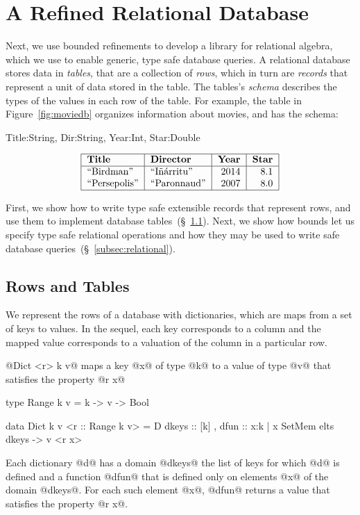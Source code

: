 \section{A Refined Relational Database}\label{sec:database}

Next, we use bounded refinements to develop a library
for relational algebra, which we use to enable generic,
type safe database queries.
%
A relational database stores data in \emph{tables},
that are a collection of \emph{rows}, which in turn 
are \emph{records} that represent a unit of data 
stored in the table.
The tables's \textit{schema} describes the types of 
the values in each row of the table.
For example, the table in Figure~\ref{fig:moviedb} organizes 
information about movies, and has the schema:
%
\begin{code}
 Title:String, Dir:String, Year:Int, Star:Double
\end{code}

\begin{table}[h]
\captionsetup{justification=centering}
\caption{Example entries for Movies Database.}
\label{fig:moviedb} 
\centering
$$
\begin{tabular}{| l | l| r | r |}
  \hline
  \textbf{Title} & \textbf{Director} & \textbf{Year} & \textbf{Star} \\
  \hline  
  ``Birdman'' & ``I\~{n}\'{a}rritu''   & 2014 & 8.1\\
  ``Persepolis''  & ``Paronnaud'' & 2007 & 8.0 \\ 
  \hline
\end{tabular}
$$
\end{table}

First, we show how to write type safe extensible 
records  that represent rows, and use them to 
implement database tables~(\S~\ref{subsec:records}). 
%
Next, we show how bounds let us specify type 
safe relational operations and how they may be 
used to write safe database queries~(\S~\ref{subsec:relational}).

\subsection{Rows and Tables}\label{subsec:records}

We represent the rows of a database with dictionaries, 
which are maps from a set of keys to values.
In the sequel, each key corresponds to a column and 
the mapped value corresponds to a valuation of the column 
in a particular row.

 @Dict <r> k v@ maps a key @x@ of 
type @k@ to a value of type @v@ that satisfies the property @r x@
%
\begin{code}
  type Range k v = k -> v -> Bool
   
  data Dict k v <r :: Range k v> = D {
      dkeys :: [k]
    , dfun  :: x:{k | x SetMem elts dkeys} -> v <r x>
    }
\end{code}      
%
Each dictionary @d@ has a domain @dkeys@ 
\ie the list of keys for which @d@ is defined 
and a function @dfun@ that is defined only on
elements @x@ of the domain @dkeys@.
%
For each such element @x@, @dfun@ returns a value that satisfies the
property @r x@.

